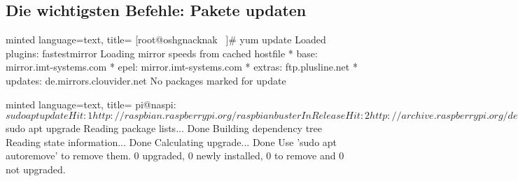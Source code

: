 \documentclass[
    ngerman,
    accentcolor=3b,
    dark_mode,
    fontsize= 12pt,
    a4paper,
    aspectratio=169,
    colorback=true,
    fancy_row_colors,
    leqno,
    fleqn,
    boxarc=3pt,
    fleqn,
]{algoslides}
\begin{document}
    \subsection{Die wichtigsten Befehle: Pakete updaten}
    \begin{frame}[fragile]
        \slidehead{}
        \begin{codeBlock}[fontsize=\tiny]{minted language=text, title=}
            [root@oshgnacknak ~]# yum update
            Loaded plugins: fastestmirror
            Loading mirror speeds from cached hostfile
             * base: mirror.imt-systems.com
             * epel: mirror.imt-systems.com
             * extras: ftp.plusline.net
             * updates: de.mirrors.clouvider.net
            No packages marked for update
        \end{codeBlock}
    \end{frame}
    \begin{frame}[fragile]
        \slidehead{}
        \begin{codeBlock}[fontsize=\tiny, escapeinside=§§]{minted language=text, title=}
            pi@naspi:~ $ sudo apt update
            Hit:1 http://raspbian.raspberrypi.org/raspbian buster InRelease
            Hit:2 http://archive.raspberrypi.org/debian buster InRelease
            Get:3 https://download.docker.com/linux/raspbian buster InRelease [33.6 kB]
            Hit:4 https://deb.nodesource.com/node_14.x buster InRelease
            Fetched 33.6 kB in 1s (27.9 kB/s)
            Reading package lists... Done
            Building dependency tree
            Reading state information... Done
            All packages are up to date.
            pi@naspi:~ $ sudo apt upgrade
            Reading package lists... Done
            Building dependency tree
            Reading state information... Done
            Calculating upgrade... Done
            Use 'sudo apt autoremove' to remove them.
            0 upgraded, 0 newly installed, 0 to remove and 0 not upgraded.
        \end{codeBlock}
    \end{frame}
    \begin{frame}[fragile]
        \slidehead{}
    \end{frame}
\end{document}
